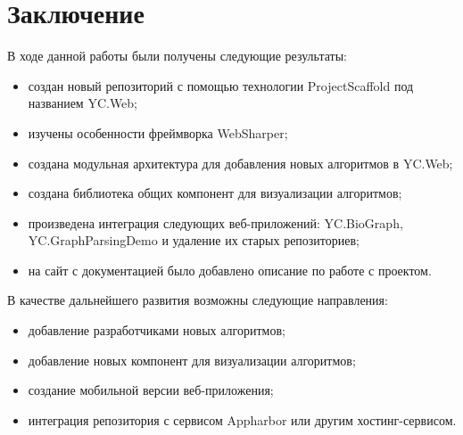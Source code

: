 \documentclass[14pt]{matmex-diploma}
\begin{document}
\section*{Заключение}
В ходе данной работы были получены следующие результаты:
\begin{itemize}
    \item создан новый репозиторий с помощью технологии \linebreak ProjectScaffold под названием YC.Web;
    \item изучены особенности фреймворка WebSharper;
    \item создана модульная архитектура для добавления новых алгоритмов в YC.Web;
    \item создана библиотека общих компонент для визуализации алгоритмов;
    \item произведена интеграция следующих веб-приложений: 
        \linebreak YC.BioGraph, YC.GraphParsingDemo и удаление их старых репозиториев;
    \item на сайт с документацией было добавлено описание по работе с проектом.
\end{itemize}

В качестве дальнейшего развития возможны следующие направления: 

\begin{itemize}
    \item добавление разработчиками новых алгоритмов; 
    \item добавление новых компонент для визуализации алгоритмов;
    \item создание мобильной версии веб-приложения;
    \item интеграция репозитория с сервисом Appharbor или другим хостинг-сервисом.
\end{itemize}


\setmonofont[Mapping=tex-text]{CMU Typewriter Text}


\end{document}
